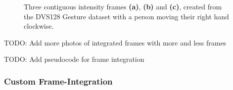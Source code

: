 \begin{figure}[htb]%
    \centering
    \qquad
    \qquad
    \caption{Three contiguous intensity frames \textbf{(a)}, \textbf{(b)} and \textbf{(c)}, created from the DVS128 Gesture dataset with a person moving their right hand clockwise.}%
    \label{fig:dvs128_integrated_frames}%
\end{figure}

\color{red} TODO: Add more photos of integrated frames with more and less frames \color{black}

\color{red} TODO: Add pseudocode for frame integration \color{black}

\subsubsection{Custom Frame-Integration}

